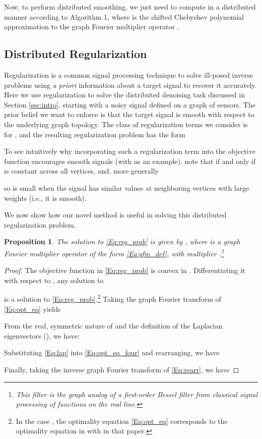 \documentclass[conference]{IEEEtran}
\newtheorem{proposition}{\textbf{Proposition}}
\begin{document}
Now, to perform distributed smoothing, we just need to compute  in a distributed manner according to Algorithm 1, where  is the shifted Chebyshev polynomial approximation to the graph Fourier multiplier operator .





\subsection{Distributed Regularization} \label{Se:reg}
Regularization is a common signal processing technique to solve ill-posed inverse problems using \emph{a priori} information about a target signal to recover it accurately. Here we use regularization to solve the distributed denoising task discussed in Section \ref{sec:intro}, starting with a noisy signal  defined on a graph of  sensors. The prior belief we want to
enforce is that the target signal is smooth with respect to the underlying graph topology. The class of regularization terms we consider is  for , and the resulting regularization problem has the form

To see intuitively why incorporating such a regularization term into the objective function encourages smooth signals (with  as an example), note that  if and only if  is constant across all vertices, and, more generally

so  is small when the signal  has similar values at neighboring vertices with large weights (i.e., it is smooth).

We now show how our novel method is useful in solving this distributed regularization problem.
\begin{proposition} \label{Prop:reg}
The solution to \eqref{Eq:reg_prob} is given by , where  is a graph Fourier multiplier operator of the form \eqref{Eq:gfm_def}, with multiplier  .\footnote{This filter  is the graph analog of a first-order Bessel filter from classical signal processing of functions on the real line.}
\end{proposition}
\begin{proof}
The objective function in \eqref{Eq:reg_prob} is convex in . Differentiating it with respect to , any solution  to

is a solution to \eqref{Eq:reg_prob}.\footnote{In the case , the optimality equation \eqref{Eq:opt_eq} corresponds to the optimality equation in \cite[Section III-A]{elmoataz} with  in that paper.} Taking the graph Fourier transform of \eqref{Eq:opt_eq} yields

From the real, symmetric nature of  and the definition of the Laplacian eigenvectors (), we have:

Substituting \eqref{Eq:lap} into \eqref{Eq:opt_eq_four} and rearranging, we have

Finally, taking the inverse graph Fourier transform of \eqref{Eq:rearr}, we have

\end{proof}
\end{document}
